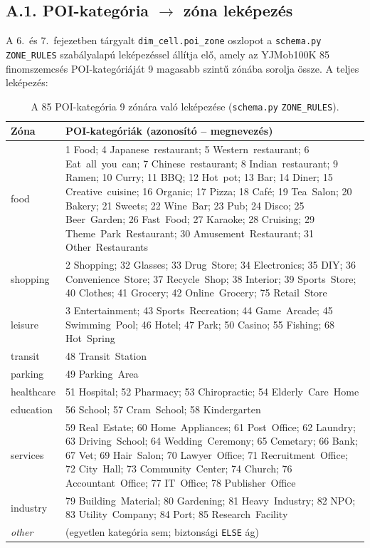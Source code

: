 
\subsection*{A.1. POI-kategória \texorpdfstring{$\to$}{->} zóna leképezés}
\label{appendix:poi_zone_mapping}

A 6.\ és 7.\ fejezetben tárgyalt \texttt{dim\_cell.poi\_zone} oszlopot a \texttt{schema.py} \texttt{ZONE\_RULES} szabályalapú leképezéssel állítja elő, amely az YJMob100K 85 finomszemcsés POI-kategóriáját 9 magasabb szintű zónába sorolja össze. A teljes leképezés:

\begin{table}[H]
\centering
\caption{A 85 POI-kategória 9 zónára való leképezése (\texttt{schema.py} \texttt{ZONE\_RULES}).}
\label{tab:poi_zone_mapping}
\small
\begin{tabular}{l p{}}
\hline
\textbf{Zóna} & \textbf{POI-kategóriák (azonosító -- megnevezés)} \\
\hline
food       & 1 Food; 4 Japanese~restaurant; 5 Western~restaurant; 6 Eat~all~you~can; 7 Chinese~restaurant; 8 Indian~restaurant; 9 Ramen; 10 Curry; 11 BBQ; 12 Hot~pot; 13 Bar; 14 Diner; 15 Creative~cuisine; 16 Organic; 17 Pizza; 18 Café; 19 Tea~Salon; 20 Bakery; 21 Sweets; 22 Wine~Bar; 23 Pub; 24 Disco; 25 Beer~Garden; 26 Fast~Food; 27 Karaoke; 28 Cruising; 29 Theme~Park~Restaurant; 30 Amusement~Restaurant; 31 Other~Restaurants \\[2pt]
shopping   & 2 Shopping; 32 Glasses; 33 Drug~Store; 34 Electronics; 35 DIY; 36 Convenience~Store; 37 Recycle~Shop; 38 Interior; 39 Sports~Store; 40 Clothes; 41 Grocery; 42 Online~Grocery; 75 Retail~Store \\[2pt]
leisure    & 3 Entertainment; 43 Sports~Recreation; 44 Game~Arcade; 45 Swimming~Pool; 46 Hotel; 47 Park; 50 Casino; 55 Fishing; 68 Hot~Spring \\[2pt]
transit    & 48 Transit~Station \\[2pt]
parking    & 49 Parking~Area \\[2pt]
healthcare & 51 Hospital; 52 Pharmacy; 53 Chiropractic; 54 Elderly~Care~Home \\[2pt]
education  & 56 School; 57 Cram~School; 58 Kindergarten \\[2pt]
services   & 59 Real~Estate; 60 Home~Appliances; 61 Post~Office; 62 Laundry; 63 Driving~School; 64 Wedding~Ceremony; 65 Cemetary; 66 Bank; 67 Vet; 69 Hair~Salon; 70 Lawyer~Office; 71 Recruitment~Office; 72 City~Hall; 73 Community~Center; 74 Church; 76 Accountant~Office; 77 IT~Office; 78 Publisher~Office \\[2pt]
industry   & 79 Building~Material; 80 Gardening; 81 Heavy~Industry; 82 NPO; 83 Utility~Company; 84 Port; 85 Research~Facility \\[2pt]
\textit{other} & (egyetlen kategória sem; biztonsági \texttt{ELSE} ág) \\
\hline
\end{tabular}
\end{table}

